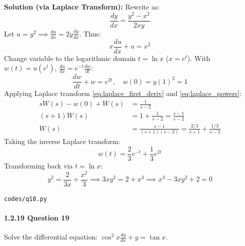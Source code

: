 \documentclass{article}
\begin{document}
\textbf{Solution (via Laplace Transform):} Rewrite as:
\begin{equation}
\frac{dy}{dx} = \frac{y^2 - x^2}{2xy}
\end{equation}
Let $u = y^2 \implies \frac{du}{dx} = 2y \frac{dy}{dx}$. Thus:
\begin{equation}
x \frac{du}{dx} + u = x^2
\end{equation}
Change variable to the logarithmic domain $t = \ln x$ ($x = e^t$). With $w(t) = u(e^t)$, $\frac{du}{dx} = e^{-t} \frac{dw}{dt}$:
\begin{equation}
\frac{dw}{dt} + w = e^{2t}, \quad w(0) = y(1)^2 = 1
\end{equation}
Applying Laplace transform \eqref{eq:laplace_first_deriv} and \eqref{eq:laplace_powers}:
\begin{align}
s W(s) - w(0) + W(s) &= \frac{1}{s - 2} \\
(s + 1)W(s) &= 1 + \frac{1}{s - 2} = \frac{s - 1}{s - 2} \\
W(s) &= \frac{s - 1}{(s + 1)(s - 2)} = \frac{2/3}{s + 1} + \frac{1/3}{s - 2}
\end{align}
Taking the inverse Laplace transform:
\begin{equation}
w(t) = \frac{2}{3}e^{-t} + \frac{1}{3}e^{2t}
\end{equation}
Transforming back via $t = \ln x$:
\begin{equation}
y^2 = \frac{2}{3x} + \frac{x^2}{3} \implies 3x y^2 = 2 + x^3 \implies x^3 - 3x y^2 + 2 = 0
\end{equation}
\begin{tcolorbox}[colback=gray!10,colframe=black,width=\linewidth]
\texttt{codes/q18.py}
\end{tcolorbox}

\paragraph{1.2.19 Question 19}
Solve the differential equation: $\cos^2 x \frac{dy}{dx} + y = \tan x$.
\end{document}
